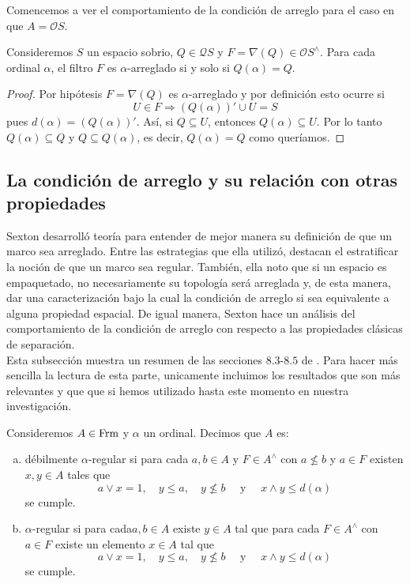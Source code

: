 Comencemos a ver el comportamiento de la condición de arreglo para el caso en que $A=\mathcal{O}S$.

\begin{lem}\label{Lema8.2.3}
    Consideremos $S$ un espacio sobrio, $Q\in \mathcal{Q}S$ y $F=\nabla(Q)\in \mathcal{O}S^\wedge$. Para cada ordinal $\alpha$, el filtro $F$ es $\alpha$-arreglado si y solo si $Q(\alpha)=Q$.
\end{lem}

\begin{proof}
    Por hipótesis $F=\nabla (Q)$ es $\alpha$-arreglado y por definición esto ocurre si 
    \[
    U\in F\Rightarrow (Q(\alpha))'\cup U=S
    \]
    pues $d(\alpha)=(Q(\alpha))'$. Así, si $Q\subseteq U$, entonces $Q(\alpha)\subseteq U$. Por lo tanto $Q(\alpha)\subseteq Q$ y $Q\subseteq Q(\alpha)$, es decir, $Q(\alpha)=Q$ como queríamos.
\end{proof}

\subsection{La condición de arreglo y su relación con otras propiedades}\label{Resumen tydi}

Sexton desarrolló teoría para entender de mejor manera su definición de que un marco sea arreglado. Entre las estrategias que ella utilizó, destacan el estratificar la noción de que un marco sea regular. 
También, ella noto que si un espacio es empaquetado, no necesariamente su topología será arreglada y, de esta manera, dar una caracterización bajo la cual la condición de arreglo si sea equivalente a alguna propiedad 
espacial. De igual manera, Sexton hace un análisis del comportamiento de la condición de arreglo con respecto a las propiedades clásicas de separación.\\

Esta subsección muestra un resumen de las secciones $8.3$-$8.5$ de \cite{R.S.}. Para hacer más sencilla la lectura de esta parte, unicamente incluimos los resultados que son más relevantes y que 
que si hemos utilizado hasta este momento en nuestra investigación.
\begin{dfn}\label{Definición8.3.1}
    Consideremos $A\in \mathrm{Frm}$ y $\alpha$ un ordinal. Decimos que $A$ es:
    \begin{enumerate}[a)]
        \item débilmente $\alpha$-regular si para cada $a, b\in A$ y $F\in A^\wedge$ con $a\nleq b$ y $a\in F$ existen $x, y\in A$ tales que 
        \[
        a\vee x=1,\quad y\leq a,\quad y\nleq b\quad \mbox{ y }\quad x\wedge y\leq d(\alpha)
        \]
        se cumple.
        \item $\alpha$-regular si para cada$a,b\in A$ existe $y\in A$ tal que para cada $F\in A^\wedge$ con $a\in F$ existe un elemento $x\in A$ tal que 
        \[
        a\vee x=1,\quad y\leq a,\quad y\nleq b\quad \mbox{ y }\quad x\wedge y\leq d(\alpha)
        \]
        se cumple.
    \end{enumerate}
\end{dfn}

